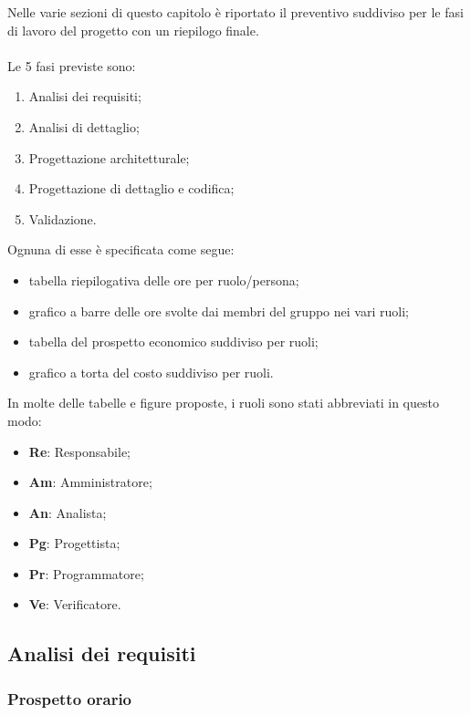 
Nelle varie sezioni di questo capitolo è riportato il preventivo suddiviso per le fasi di lavoro del progetto con un riepilogo finale.\\
\\Le 5 fasi previste sono:
\begin{enumerate}
	\item Analisi dei requisiti;
	\item Analisi di dettaglio;
	\item Progettazione architetturale;
	\item Progettazione di dettaglio e codifica;
	\item Validazione.
\end{enumerate}
Ognuna di esse è specificata come segue:
\begin{itemize}
	\item tabella riepilogativa delle ore per ruolo/persona;
	\item grafico a barre delle ore svolte dai membri del gruppo nei vari ruoli;
	\item tabella del prospetto economico suddiviso per ruoli;
	\item grafico a torta del costo suddiviso per ruoli.
\end{itemize}
In molte delle tabelle e figure proposte, i ruoli sono stati abbreviati in questo modo:
\begin{itemize}
	\item \textbf{Re}: Responsabile;
	\item \textbf{Am}: Amministratore;
	\item \textbf{An}: Analista;
	\item \textbf{Pg}: Progettista;
	\item \textbf{Pr}: Programmatore;
	\item \textbf{Ve}: Verificatore.
\end{itemize}

\newpage

\subsection{Analisi dei requisiti}
	
	\subsubsection{Prospetto orario}
			

